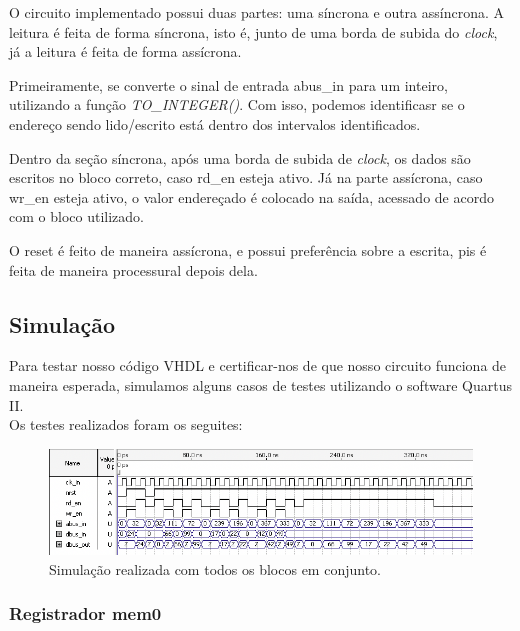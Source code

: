 \documentclass{article}
\begin{document}
O circuito implementado possui duas partes: uma síncrona e outra assíncrona. A leitura é feita de forma síncrona, isto é, junto de uma borda de subida do \textit{clock}, já a leitura é feita de forma assícrona.

Primeiramente, se converte o sinal de entrada abus\_in para um inteiro, utilizando a função \textit{TO\_INTEGER()}. Com isso, podemos identificasr se o endereço sendo lido/escrito está dentro dos intervalos identificados.

Dentro da seção síncrona, após uma borda de subida de \textit{clock}, os dados são escritos no bloco correto, caso rd\_en esteja ativo. Já na parte assícrona, caso wr\_en esteja ativo, o valor endereçado é colocado na saída, acessado de acordo com o bloco utilizado.

O reset é feito de maneira assícrona, e possui preferência sobre a escrita, pis é feita de maneira processural depois dela.

\subsection{Simulação}

Para testar nosso código VHDL e certificar-nos de que nosso circuito funciona de maneira esperada, simulamos alguns casos de testes utilizando o software Quartus II.\\

Os testes realizados foram os seguites:

\begin{figure}[ht]
\begin{center}
        \includegraphics[width=15cm]{images/ram-mem-all.png}
        \caption{Simulação realizada com todos os blocos em conjunto.}
\end{center}
\end{figure}

\subsubsection{Registrador mem0}
\end{document}
